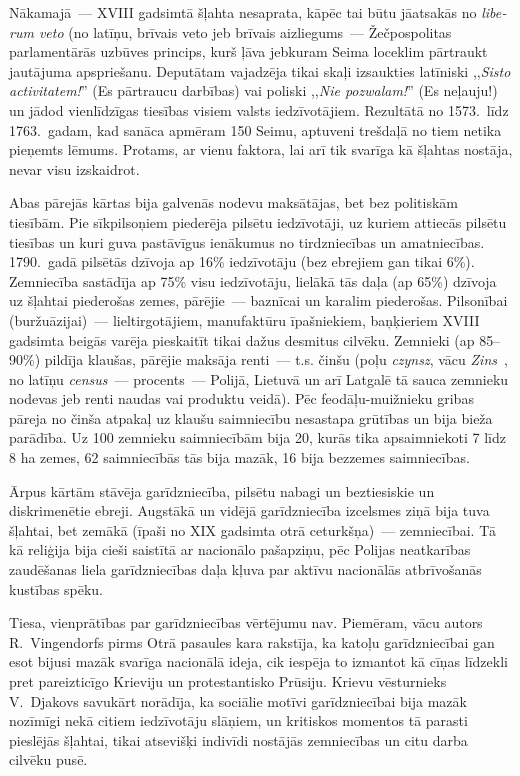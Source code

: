 \documentclass[twoside,a5paper,12pt,fleqn,openany]{extbook}
\newcommand{\pltxti}[1]{\textit{\textpolish{#1}}}
\newcommand{\detxti}[1]{\textit{\textgerman{#1}}}
\newcommand{\latxti}[1]{\textit{\textlatin{#1}}}
\begin{document}
Nākamajā~--- XVIII gadsimtā šļahta nesaprata, kāpēc tai būtu jāatsakās no \latxti{liberum veto} (no latīņu, brīvais veto jeb brīvais aizliegums~--- Žečpospolitas parlamentārās uzbūves princips, kurš ļāva jebkuram Seima loceklim pārtraukt jautājuma apspriešanu. Deputātam vajadzēja tikai skaļi izsaukties latīniski ,,\latxti{Sisto activitatem!}'' (Es pārtraucu darbības) vai poliski ,,\pltxti{Nie pozwalam!}'' (Es neļauju!) un jādod vienlīdzīgas tiesības visiem valsts iedzīvotājiem. Rezultātā no 1573.~līdz 1763.~gadam, kad sanāca apmēram 150 Seimu, aptuveni trešdaļā no tiem netika pieņemts lēmums. Protams, ar vienu faktora, lai arī tik svarīga kā šļahtas nostāja, nevar visu izskaidrot.

Abas pārejās kārtas bija galvenās nodevu maksātājas, bet bez politiskām tiesībām. Pie sīkpilsoņiem piederēja pilsētu iedzīvotāji, uz kuriem attiecās pilsētu tiesības un kuri guva pastāvīgus ienākumus no tirdzniecības un amatniecības. 1790.~gadā pilsētās dzīvoja ap 16\% iedzīvotāju (bez ebrejiem gan tikai 6\%). Zemniecība sastādīja ap 75\% visu iedzīvotāju, lielākā tās daļa (ap 65\%) dzīvoja uz šļahtai piederošas zemes, pārējie~--- baznīcai un karalim piederošas. Pilsonībai (buržuāzijai)~--- lieltirgotājiem, manufaktūru īpašniekiem, baņķieriem XVIII gadsimta beigās varēja pieskaitīt tikai dažus desmitus cilvēku. Zemnieki (ap 85--90\%) pildīja klaušas, pārējie maksāja renti~--- t.s. činšu (poļu \pltxti{czynsz}, vācu \detxti{Zins}~, no latīņu \latxti{census}~--- procents~--- Polijā, Lietuvā un arī Latgalē tā sauca zemnieku nodevas jeb renti naudas vai produktu veidā). Pēc feodāļu-muižnieku gribas pāreja no činša atpakaļ uz klaušu saimniecību nesastapa grūtības un bija bieža parādība. Uz 100 zemnieku saimniecībām bija 20, kurās tika apsaimniekoti 7 līdz 8 ha zemes, 62 saimniecībās tās bija mazāk, 16 bija bezzemes saimniecības.

Ārpus kārtām stāvēja garīdzniecība, pilsētu nabagi un beztiesiskie un diskrimenētie ebreji. Augstākā un vidējā garīdzniecība izcelsmes ziņā bija tuva šļahtai, bet zemākā (īpaši no XIX gadsimta otrā ceturkšņa)~--- zemniecībai. Tā kā reliģija bija cieši saistītā ar nacionālo pašapziņu, pēc Polijas neatkarības zaudēšanas liela garīdzniecības daļa kļuva par aktīvu nacionālās atbrīvošanās kustības spēku.

Tiesa, vienprātības par garīdzniecības vērtējumu nav. Piemēram, vācu autors R.~Vingendorfs pirms Otrā pasaules kara rakstīja, ka katoļu garīdzniecībai gan esot bijusi mazāk svarīga nacionālā ideja, cik iespēja to izmantot kā cīņas līdzekli pret pareizticīgo Krieviju un protestantisko Prūsiju. Krievu vēsturnieks V.~Djakovs savukārt norādīja, ka sociālie motīvi garīdzniecībai bija mazāk nozīmīgi nekā citiem iedzīvotāju slāņiem, un kritiskos momentos tā parasti pieslējās šļahtai, tikai atsevišķi indivīdi nostājās zemniecības un citu darba cilvēku pusē.
\end{document}
